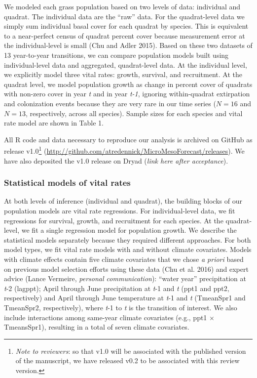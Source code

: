 \documentclass[12pt,]{article}
\let\rmarkdownfootnote\footnote%
\def\footnote{\protect\rmarkdownfootnote}
\begin{document}
We modeled each grass population based on two levels of data: individual
and quadrat. The individual data are the ``raw'' data. For the
quadrat-level data we simply sum individual basal cover for each quadrat
by species. This is equivalent to a near-perfect census of quadrat
percent cover because measurement error at the individual-level is small
(Chu and Adler 2015). Based on these two datasets of 13 year-to-year
transitions, we can compare population models built using
individual-level data and aggregated, quadrat-level data. At the
individual level, we explicitly model three vital rates: growth,
survival, and recruitment. At the quadrat level, we model population
growth as change in percent cover of quadrats with non-zero cover in
year \emph{t} and in year \emph{t-1}, ignoring within-quadrat
extirpation and colonization events because they are very rare in our
time series (\(N=16\) and \(N=13\), respectively, across all species).
Sample sizes for each species and vital rate model are shown in Table 1.

All R code and data necessary to reproduce our analysis is archived on
GitHub as release v1.0\footnote{\emph{Note to reviewers}: so that v1.0
  will be associated with the published version of the manuscript, we
  have released v0.2 to be associated with this review version.}
(\url{http://github.com/atredennick/MicroMesoForecast/releases}). We
have also deposited the v1.0 release on Dryad (\emph{link here after
acceptance}).

\subsubsection{Statistical models of vital
rates}\label{statistical-models-of-vital-rates}

At both levels of inference (individual and quadrat), the building
blocks of our population models are vital rate regressions. For
individual-level data, we fit regressions for survival, growth, and
recruitment for each species. At the quadrat-level, we fit a single
regression model for population growth. We describe the statistical
models separately because they required different approaches. For both
model types, we fit vital rate models with and without climate
covariates. Models with climate effects contain five climate covariates
that we chose \emph{a priori} based on previous model selection efforts
using these data (Chu et al. 2016) and expert advice (Lance Vermeire,
\emph{personal communication}): ``water year'' precipitation at
\emph{t}-2 (lagppt); April through June precipitation at \emph{t}-1 and
\emph{t} (ppt1 and ppt2, respectively) and April through June
temperature at \emph{t}-1 and \emph{t} (TmeanSpr1 and TmeanSpr2,
respectively), where \emph{t}-1 to \emph{t} is the transition of
interest. We also include interactions among same-year climate
covariates (e.g., ppt1 \(\times\) TmeansSpr1), resulting in a total of
seven climate covariates.
\end{document}
